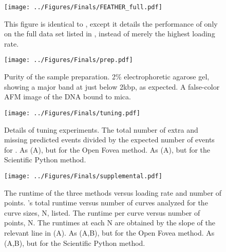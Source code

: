 \begin{figure}[htp]
\caption[Performance of \name{} on larger data set]{\noindent{} This figure is identical to , except it details the performance of only \name{} on the full data set listed in , instead of merely the highest loading rate.   }
\centering
\texttt{[image: ../Figures/Finals/FEATHER\_full.pdf]}%
\end{figure}

\begin{figure}[htp]
\caption[Verification of sample purity]{\noindent{} Purity of the sample preparation.  2\% electrophoretic agarose gel, showing a major band at just below 2kbp, as expected.  A false-color AFM image of the DNA bound to mica.  }
\centering
\texttt{[image: ../Figures/Finals/prep.pdf]}%
\end{figure}


\begin{figure}[htp]
\caption[Cross validation of algorithms and optimal parameters]{\noindent{} Details of tuning experiments.  The total number of extra and missing predicted events divided by the expected number of events for \name{}.  As (A), but for the Open Fovea method.  As (A), but for the Scientific Python method.  }
\centering
\texttt{[image: ../Figures/Finals/tuning.pdf]}%
\end{figure}



\begin{figure}
\caption[Algorithmic runtime versus loading rate]{\noindent{} The runtime of the three methods versus loading rate and number of points.  \name{}'s total runtime versus number of curves analyzed for the curve sizes, N, listed.  The runtime per curve versus number of points, N. The runtimes at each N are obtained by the slope of the relevant line in (A).   As (A,B), but for the Open Fovea method.  As (A,B), but for the Scientific Python method.  }
\centering
\texttt{[image: ../Figures/Finals/supplemental.pdf]}%
\end{figure}





%

%
